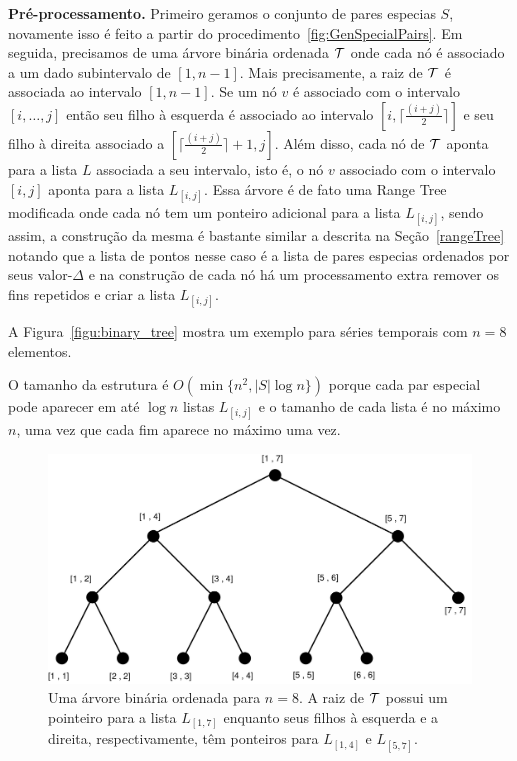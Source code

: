 \documentclass[dissertacao, brazil]{ThesisPUC}
\begin{document}
\textbf{Pré-processamento.} Primeiro geramos o conjunto de pares especias $S$, novamente
isso é feito a partir do procedimento~\ref{fig:GenSpecialPairs}. Em seguida, precisamos 
de uma árvore binária ordenada ${\cal T}$ onde cada nó é associado a um dado subintervalo de $[1, n - 1]$. 
Mais precisamente, a raiz de ${\cal T}$ é associada ao intervalo $[1, n - 1]$. Se um nó $v$ é associado com o intervalo 
$[i, \ldots, j]$ então seu filho à esquerda é associado ao intervalo $[i, \lceil \frac{(i + j)}{2} \rceil]$ e seu filho à direita associado
a $[\lceil \frac{(i + j)}{2} \rceil  + 1, j]$. Além disso, cada nó de ${\cal T}$ aponta para a lista $L$ associada a seu intervalo,
 isto é, o nó $v$ associado com o intervalo $[i, j]$ aponta para a lista $L_{[i, j]}$. Essa árvore é de fato uma
 Range Tree modificada onde cada nó tem um ponteiro adicional para a lista $L_{[i, j]}$, sendo assim, a construção
 da mesma é bastante similar a descrita na Seção~\ref{rangeTree} notando que a lista de pontos nesse caso é 
 a lista de pares especias ordenados por seus valor-$\Delta$ e na construção de cada nó há um processamento extra remover
 os fins repetidos e criar a lista $L_{[i, j]}$.

 A Figura~\ref{figu:binary_tree} mostra um exemplo para séries temporais com $n = 8$ elementos. 
 
O tamanho da estrutura é $O(\min\{n^2, |S|\log n\})$ porque cada par especial pode aparecer em até $\log n$ listas $L_{[i, j]}$ e o tamanho de cada lista
é no máximo $n$, uma vez que cada fim aparece no máximo uma vez.

\begin{figure}[htp]
\begin{center}
\includegraphics[scale=0.2]{arvore.pdf}
\caption{Uma árvore binária ordenada para $n = 8$. A raiz de ${\cal T}$ possui um pointeiro para a lista $L_{[1,7]}$ enquanto seus filhos à esquerda 
e a direita, respectivamente, têm ponteiros para $L_{[1,4]}$ e $L_{[5,7]}$. }
\label{fig:binary_tree}
\end{center}
\end{figure}
\end{document}
